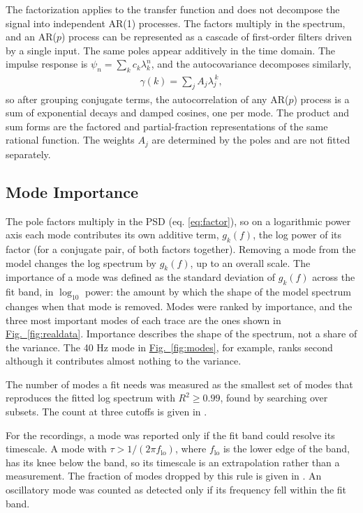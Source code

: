 \documentclass[pdflatex,sn-mathphys-num]{sn-jnl}
\newcommand{\figpanel}[2]{\hyperref[#1]{Fig.~\ref*{#1}#2}}
\begin{document}
The factorization applies to the transfer function and does not decompose the signal into independent AR(1) processes. The factors multiply in the spectrum, and an AR($p$) process can be represented as a cascade of first-order filters driven by a single input. The same poles appear additively in the time domain. The impulse response is $\psi_n = \sum_k c_k \lambda_k^n$, and the autocovariance decomposes similarly,
\begin{align}
\gamma(k) = \sum_j A_j \lambda_j^{\,k}, \label{eq:acfmodes}
\end{align}
so after grouping conjugate terms, the autocorrelation of any AR($p$) process is a sum of exponential decays and damped cosines, one per mode. The product and sum forms are the factored and partial-fraction representations of the same rational function. The weights $A_j$ are determined by the poles and are not fitted separately.

\subsection{Mode Importance}

The pole factors multiply in the PSD (eq. \ref{eq:factor}), so on a logarithmic power axis each mode contributes its own additive term, $g_k(f)$, the log power of its factor (for a conjugate pair, of both factors together). Removing a mode from the model changes the log spectrum by $g_k(f)$, up to an overall scale. The importance of a mode was defined as the standard deviation of $g_k(f)$ across the fit band, in $\log_{10}$ power: the amount by which the shape of the model spectrum changes when that mode is removed. Modes were ranked by importance, and the three most important modes of each trace are the ones shown in \figpanel{fig:realdata}{}. Importance describes the shape of the spectrum, not a share of the variance. The 40 Hz mode in \figpanel{fig:modes}{}, for example, ranks second although it contributes almost nothing to the variance.

The number of modes a fit needs was measured as the smallest set of modes that reproduces the fitted log spectrum with $R^2 \geq 0.99$, found by searching over subsets. The count at three cutoffs is given in .

For the recordings, a mode was reported only if the fit band could resolve its timescale. A mode with $\tau > 1/(2\pi f_{\mathrm{lo}})$, where $f_{\mathrm{lo}}$ is the lower edge of the band, has its knee below the band, so its timescale is an extrapolation rather than a measurement. The fraction of modes dropped by this rule is given in . An oscillatory mode was counted as detected only if its frequency fell within the fit band.
\end{document}
